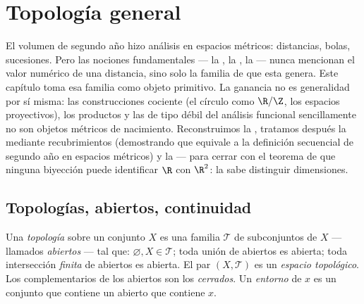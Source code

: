 \chapter{Topología general}\label{ch:b3:topology}

El volumen de segundo año hizo análisis en espacios métricos:
distancias, bolas, sucesiones. Pero las nociones fundamentales --- la
, la , la
 --- nunca mencionan el
valor numérico de una distancia, sino solo la familia de
\emph{} que esta genera. Este
capítulo toma esa familia como objeto primitivo. La ganancia no es
generalidad por sí misma: las construcciones cociente (el círculo como
$\R/\Z$, los espacios proyectivos), los productos y las  de
tipo débil del análisis funcional sencillamente no son objetos métricos
de nacimiento. Reconstruimos la
, tratamos después la
 mediante recubrimientos  (demostrando que equivale a
la definición secuencial de segundo año en espacios métricos) y la
 --- para cerrar con el
teorema de que ninguna biyección
 puede identificar $\R$ con
$\R^2$: la  sabe distinguir
dimensiones.

\section{Topologías, abiertos, continuidad}

\begin{definition}\label{def:b3:topology:topology}
Una \emph{topología} sobre un conjunto $X$ es una
familia $\mathcal T$ de subconjuntos de $X$ --- llamados
\emph{abiertos} --- tal que: $\varnothing, X \in
\mathcal T$; toda unión de abiertos es abierta; toda intersección
\emph{finita} de abiertos es abierta. El par $(X, \mathcal T)$ es un
\emph{espacio topológico}. Los complementarios de los abiertos son los
\emph{cerrados}. Un \emph{entorno} de $x$ es un conjunto
que contiene un abierto que contiene $x$.
\end{definition}

